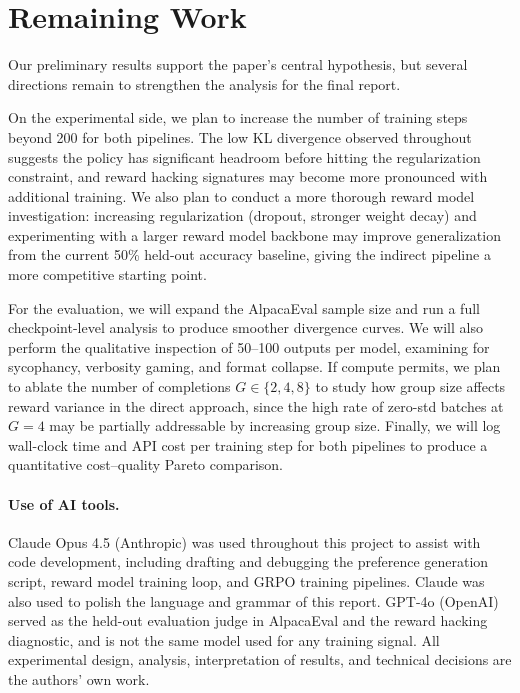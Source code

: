 \documentclass{article}
\begin{document}
\section{Remaining Work}

Our preliminary results support the paper's central hypothesis, but several directions remain to strengthen the analysis for the final report.

On the experimental side, we plan to increase the number of training steps beyond 200 for both pipelines. The low KL divergence observed throughout suggests the policy has significant headroom before hitting the regularization constraint, and reward hacking signatures may become more pronounced with additional training. We also plan to conduct a more thorough reward model investigation: increasing regularization (dropout, stronger weight decay) and experimenting with a larger reward model backbone may improve generalization from the current 50\% held-out accuracy baseline, giving the indirect pipeline a more competitive starting point.

For the evaluation, we will expand the AlpacaEval sample size and run a full checkpoint-level analysis to produce smoother divergence curves. We will also perform the qualitative inspection of 50--100 outputs per model, examining for sycophancy, verbosity gaming, and format collapse. If compute permits, we plan to ablate the number of completions $G \in \{2, 4, 8\}$ to study how group size affects reward variance in the direct approach, since the high rate of zero-std batches at $G=4$ may be partially addressable by increasing group size. Finally, we will log wall-clock time and API cost per training step for both pipelines to produce a quantitative cost--quality Pareto comparison.

\paragraph{Use of AI tools.} Claude Opus 4.5 (Anthropic) was used throughout this project to assist with code development, including drafting and debugging the preference generation script, reward model training loop, and GRPO training pipelines. Claude was also used to polish the language and grammar of this report. GPT-4o (OpenAI) served as the held-out evaluation judge in AlpacaEval and the reward hacking diagnostic, and is not the same model used for any training signal. All experimental design, analysis, interpretation of results, and technical decisions are the authors' own work.
\end{document}
